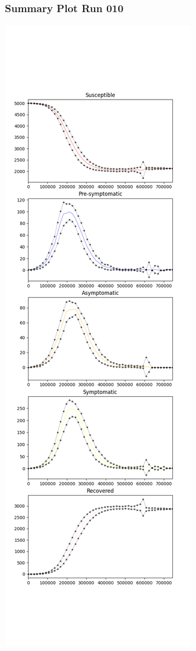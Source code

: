 \documentclass{article}
\begin{document}
\subsubsection{Summary Plot Run 010}
\includegraphics[scale=0.4]{plot_summary_run_010.png}
\end{document}
